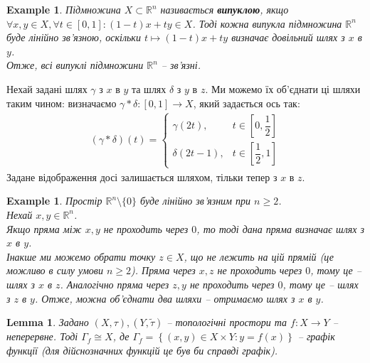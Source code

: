 \documentclass[a4paper, 10pt]{article}
\theoremstyle{theoremdd}
\newtheorem{example}[theorem]{Example}
\newtheorem{lemma}[theorem]{Lemma}
\begin{document}
\begin{example}
Підмножина $X \subset \mathbb{R}^n$ називається \textbf{випуклою}, якщо $\forall x,y \in X, \forall t \in [0,1]: (1-t)x + ty \in X$. Тоді кожна випукла підмножина $\mathbb{R}^n$ буде лінійно зв'язною, оскільки $t \mapsto (1-t)x + ty$ визначає довільний шлях з $x$ в $y$.\\
Отже, всі випуклі підмножини $\mathbb{R}^n$ -- зв'язні.
\end{example}
\noindent
Нехай задані шлях $\gamma$ з $x$ в $y$ та шлях $\delta$ з $y$ в $z$. Ми можемо їх об'єднати ці шляхи таким чином: визначаємо $\gamma*\delta \colon [0,1] \to X$, який задається ось так:
\begin{align*}
(\gamma*\delta)(t) = \begin{cases} \gamma(2t), & t \in \left[0, \dfrac{1}{2}\right] \\
\delta(2t-1), & t \in \left[\dfrac{1}{2},1\right] \end{cases}
\end{align*}
Задане відображення досі залишається шляхом, тільки тепер з $x$ в $z$.

\begin{example}
Простір $\mathbb{R}^n \setminus \{0\}$ буде лінійно зв'язним при $n \geq 2$.\\
Нехай $x,y \in \mathbb{R}^n$.\\ Якщо пряма між $x,y$ не проходить через $0$, то тоді дана пряма визначає шлях з $x$ в $y$.\\
Інакше ми можемо обрати точку $z \in X$, що не лежить на цій прямій (це можливо в силу умови $n \geq 2$). Пряма через $x,z$ не проходить через $0$, тому це -- шлях з $x$ в $z$. Аналогічно пряма через $z,y$ не проходить через $0$, тому це -- шлях з $z$ в $y$. Отже, можна об'єднати два шляхи -- отримаємо шлях з $x$ в $y$.
\end{example}

\begin{lemma}
\label{graph_function_homeomorphism}
Задано $(X,\tau), (Y,\tilde{\tau})$ -- топологічні простори та $f \colon X \to Y$ -- неперервне. Тоді $\Gamma_f \cong X$, де $\Gamma_f = \left\{ (x,y) \in X \times Y : y = f(x) \right\}$ -- графік функції (для дійснозначних функцій це був би справді графік).
\end{lemma}
\end{document}
